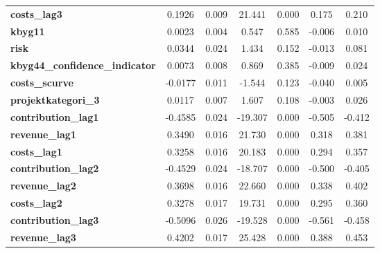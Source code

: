 \begin{center}
\begin{tabular}{lcccccc}
\textbf{costs\_lag3}                        &       0.1926  &        0.009     &    21.441  &         0.000        &        0.175    &        0.210     \\
\textbf{kbyg11}                             &       0.0023  &        0.004     &     0.547  &         0.585        &       -0.006    &        0.010     \\
\textbf{risk}                               &       0.0344  &        0.024     &     1.434  &         0.152        &       -0.013    &        0.081     \\
\textbf{kbyg44\_confidence\_indicator}      &       0.0073  &        0.008     &     0.869  &         0.385        &       -0.009    &        0.024     \\
\textbf{costs\_scurve}                      &      -0.0177  &        0.011     &    -1.544  &         0.123        &       -0.040    &        0.005     \\
\textbf{projektkategori\_3}                 &       0.0117  &        0.007     &     1.607  &         0.108        &       -0.003    &        0.026     \\
\textbf{contribution\_lag1}                 &      -0.4585  &        0.024     &   -19.307  &         0.000        &       -0.505    &       -0.412     \\
\textbf{revenue\_lag1}                      &       0.3490  &        0.016     &    21.730  &         0.000        &        0.318    &        0.381     \\
\textbf{costs\_lag1}                        &       0.3258  &        0.016     &    20.183  &         0.000        &        0.294    &        0.357     \\
\textbf{contribution\_lag2}                 &      -0.4529  &        0.024     &   -18.707  &         0.000        &       -0.500    &       -0.405     \\
\textbf{revenue\_lag2}                      &       0.3698  &        0.016     &    22.660  &         0.000        &        0.338    &        0.402     \\
\textbf{costs\_lag2}                        &       0.3278  &        0.017     &    19.731  &         0.000        &        0.295    &        0.360     \\
\textbf{contribution\_lag3}                 &      -0.5096  &        0.026     &   -19.528  &         0.000        &       -0.561    &       -0.458     \\
\textbf{revenue\_lag3}                      &       0.4202  &        0.017     &    25.428  &         0.000        &        0.388    &        0.453     \\

\end{tabular}
\end{center}
